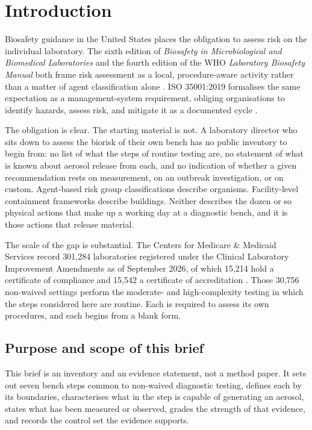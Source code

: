 \section{Introduction}

Biosafety guidance in the United States places the obligation to assess risk on
the individual laboratory. The sixth edition of \textit{Biosafety in
Microbiological and Biomedical Laboratories} and the fourth edition of the WHO
\textit{Laboratory Biosafety Manual} both frame risk assessment as a local,
procedure-aware activity rather than a matter of agent classification alone
\cite{bmbl6,wholbm4}. ISO 35001:2019 formalises the same expectation as a
management-system requirement, obliging organisations to identify hazards,
assess risk, and mitigate it as a documented cycle \cite{iso35001}.

The obligation is clear. The starting material is not. A laboratory director
who sits down to assess the biorisk of their own bench has no public inventory
to begin from: no list of what the steps of routine testing are, no statement
of what is known about aerosol release from each, and no indication of whether
a given recommendation rests on measurement, on an outbreak investigation, or
on custom. Agent-based risk group classifications describe organisms.
Facility-level containment frameworks describe buildings. Neither describes the
dozen or so physical actions that make up a working day at a diagnostic bench,
and it is those actions that release material.

The scale of the gap is substantial. The Centers for Medicare \& Medicaid
Services record 301,284 laboratories registered under the Clinical Laboratory
Improvement Amendments as of September 2026, of which 15,214 hold a certificate
of compliance and 15,542 a certificate of accreditation \cite{cms2026}. Those
30,756 non-waived settings perform the moderate- and high-complexity testing in
which the steps considered here are routine. Each is required to assess its own
procedures, and each begins from a blank form.

\subsection{Purpose and scope of this brief}

This brief is an inventory and an evidence statement, not a method paper. It
sets out seven bench steps common to non-waived diagnostic testing, defines each
by its boundaries, characterises what in the step is capable of generating an
aerosol, states what has been measured or observed, grades the strength of that
evidence, and records the control set the evidence supports.

